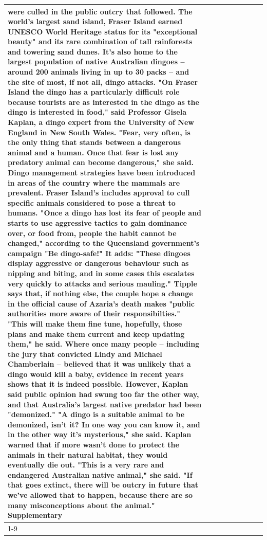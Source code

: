 \begin{table}[H]
\begin{tabular}{lllrlllll}
were culled in the public outcry that followed. The world's largest sand island, Fraser Island earned UNESCO World Heritage status for its "exceptional beauty" and its rare combination of tall rainforests and towering sand dunes. It's also home to the largest population of native Australian dingoes -- around 200 animals living in up to 30 packs -- and the site of most, if not all, dingo attacks. "On Fraser Island the dingo has a particularly difficult role because tourists are as interested in the dingo as the dingo is interested in food," said Professor Gisela Kaplan, a dingo expert from the University of New England in New South Wales. "Fear, very often, is the only thing that stands between a dangerous animal and a human. Once that fear is lost any predatory animal can become dangerous," she said. Dingo management strategies have been introduced in areas of the country where the mammals are prevalent. Fraser Island's includes approval to cull specific animals considered to pose a threat to humans. "Once a dingo has lost its fear of people and starts to use aggressive tactics to gain dominance over, or food from, people the habit cannot be changed," according to the Queensland government's campaign "Be dingo-safe!" It adds: "These dingoes display aggressive or dangerous behaviour such as nipping and biting, and in some cases this escalates very quickly to attacks and serious mauling." Tipple says that, if nothing else, the couple hope a change in the official cause of Azaria's death makes "public authorities more aware of their responsibilties." "This will make them fine tune, hopefully, those plans and make them current and keep updating them," he said. Where once many people -- including the jury that convicted Lindy and Michael Chamberlain -- believed that it was unlikely that a dingo would kill a baby, evidence in recent years shows that it is indeed possible. However, Kaplan said public opinion had swung too far the other way, and that Australia's largest native predator had been "demonized." "A dingo is a suitable animal to be demonized, isn't it? In one way you can know it, and in the other way it's mysterious," she said. Kaplan warned that if more wasn't done to protect the animals in their natural habitat, they would eventually die out. "This is a very rare and endangered Australian native animal," she said. "If that goes extinct, there will be outcry in future that we've allowed that to happen, because there are so many misconceptions about the animal." Supplementary \\
\cline{1-9}

\end{tabular}
\end{table}

